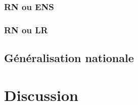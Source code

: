 \documentclass[11pt]{article}
\begin{document}
            \subsubsection*{RN ou ENS}

            \subsubsection*{RN ou LR}
        
        \subsection*{Généralisation nationale}
        
    \newpage
    \section{Discussion}

    \printbibliography
\end{document}
